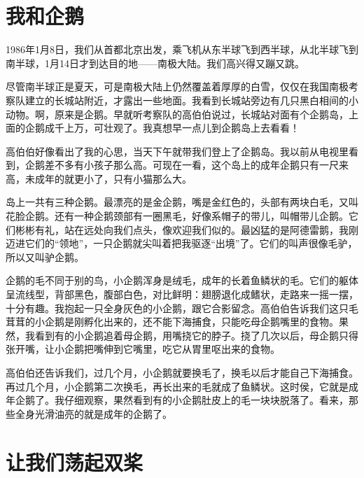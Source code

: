 \documentclass[12pt,UTF-8,openany]{ctexbook}
\begin{document}
\chapter{我和企鹅}

\begin{large}
    
    1986年1月8日，我们从首都北京出发，乘飞机从东半球飞到西半球，从北半球飞到南半球，1月14日才到达目的地——南极大陆。我们高兴得又蹦又跳。
    
    尽管南半球正是夏天，可是南极大陆上仍然覆盖着厚厚的白雪，仅仅在我国南极考察队建立的长城站附近，才露出一些地面。我看到长城站旁边有几只黑白相间的小动物。啊，原来是企鹅。早就听考察队的高伯伯说过，长城站对面有个企鹅岛，上面的企鹅成千上万，可壮观了。我真想早一点儿到企鹅岛上去看看！
    
    高伯伯好像看出了我的心思，当天下午就带我们登上了企鹅岛。我以前从电视里看到，企鹅差不多有小孩子那么高。可现在一看，这个岛上的成年企鹅只有一尺来高，未成年的就更小了，只有小猫那么大。
    
    岛上一共有三种企鹅。最漂亮的是金企鹅，嘴是金红色的，头部有两块白毛，又叫花脸企鹅。还有一种企鹅颈部有一圈黑毛，好像系帽子的带儿，叫帽带儿企鹅。它们彬彬有礼，站在远处向我们点头，像欢迎我们似的。最凶猛的是阿德雷鹅，我刚迈进它们的“领地”，一只企鹅就尖叫着把我驱逐“出境”了。它们的叫声很像毛驴，所以又叫驴企鹅。
    
    企鹅的毛不同于别的鸟，小企鹅浑身是绒毛，成年的长着鱼鳞状的毛。它们的躯体呈流线型，背部黑色，腹部白色，对比鲜明：翅膀退化成鳍状，走路来一摇一摆，十分有趣。我抱起一只全身灰色的小企鹅，跟它合影留念。高伯伯告诉我们这只毛茸茸的小企鹅是刚孵化出来的，还不能下海捕食，只能吃母企鹅嘴里的食物。果然，我看到有的小企鹅追着母企鹅，用嘴挠它的脖子。挠了几次以后，母企鹅只得张开嘴，让小企鹅把嘴伸到它嘴里，吃它从胃里呕出来的食物。
    
    高伯伯还告诉我们，过几个月，小企鹅就要换毛了，换毛以后才能自己下海捕食。再过几个月，小企鹅第二次换毛，再长出来的毛就成了鱼鳞状。这时侯，它就是成年企鹅了。我仔细观察，果然看到有的小企鹅肚皮上的毛一块块脱落了。看来，那些全身光滑油亮的就是成年的企鹅了。
    
\end{large}



\chapter{让我们荡起双桨}
\end{document}
